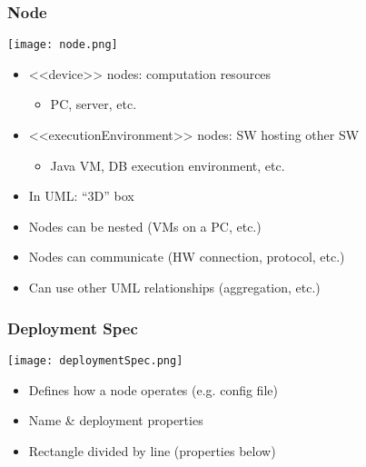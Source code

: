 \documentclass{beamer}
\begin{document}
\begin{frame}\frametitle{Node}

\begin{center}
\texttt{[image: node.png]}
\end{center}

\begin{itemize}
\item
  \textless{}\textless{}device\textgreater{}\textgreater{} nodes:
  computation resources

  \begin{itemize}
  \item
    PC, server, etc.
  \end{itemize}
\item
  \textless{}\textless{}executionEnvironment\textgreater{}\textgreater{}
  nodes: SW hosting other SW

  \begin{itemize}
  \item
    Java VM, DB execution environment, etc.
  \end{itemize}
\item
  In UML: ``3D'' box
\item
  Nodes can be nested (VMs on a PC, etc.)
\item
  Nodes can communicate (HW connection, protocol, etc.)
\item
  Can use other UML relationships (aggregation, etc.)
\end{itemize}

\end{frame}

\begin{frame}\frametitle{Deployment Spec}

\begin{center}
\texttt{[image: deploymentSpec.png]}
\end{center}

\begin{itemize}
\item
  Defines how a node operates (e.g. config file)
\item
  Name \& deployment properties
\item
  Rectangle divided by line (properties below)
\end{itemize}

\end{frame}
\end{document}
